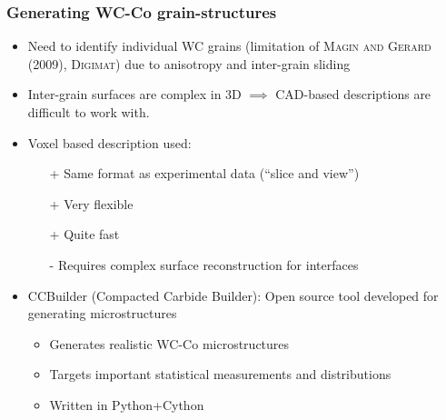 \documentclass[11pt]{beamer} %
\begin{document}
\begin{frame}
 \frametitle{Generating WC-Co grain-structures}
  \begin{itemize}
  \item Need to identify individual WC grains (limitation of \textsc{Magin and Gerard (2009), Digimat}) due to anisotropy and inter-grain sliding
  \item Inter-grain surfaces are complex in 3D $\implies$ CAD-based descriptions are difficult to work with.
  \item Voxel based description used:
   \begin{itemize}
    \item[+] Same format as experimental data (``slice and view'')
    \item[+] Very flexible
    \item[+] Quite fast
    \item[-] Requires complex surface reconstruction for interfaces
   \end{itemize}
   \item CCBuilder (Compacted Carbide Builder): Open source tool developed for generating microstructures
    \begin{itemize}
     \item Generates realistic WC-Co microstructures
     \item Targets important statistical measurements and distributions
     \item Written in Python+Cython
    \end{itemize}
  \end{itemize}
\end{frame}
\end{document}
